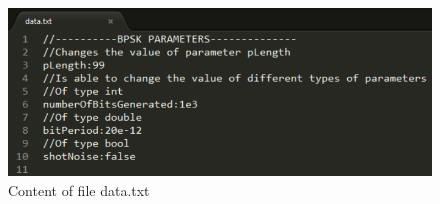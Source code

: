 \begin{figure}[H]
\centering
\includegraphics[width=0.8\linewidth]{./chapter/simulator_structure/figures/ips_input_file}
\caption{Content of file data.txt}
\label{fig:ipsfilecontent}
\end{figure}

\cleardoublepage 